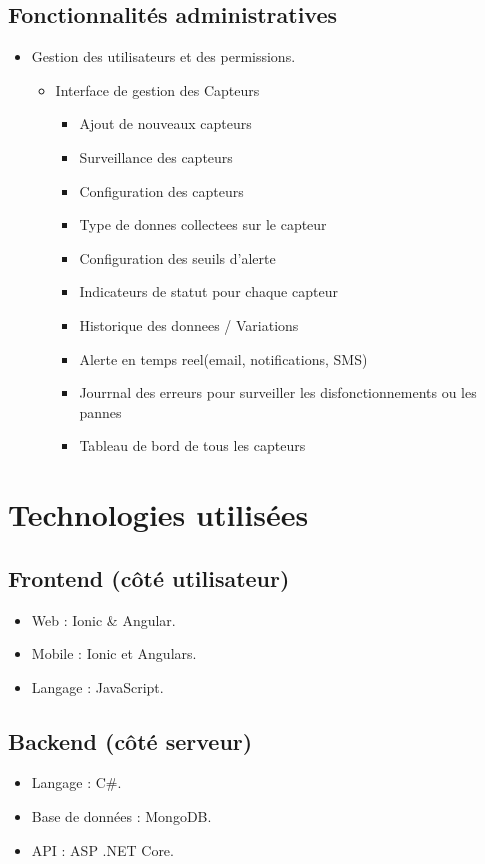 \documentclass[a4paper,12pt]{article}
\begin{document}
\subsection{Fonctionnalités administratives}
\begin{itemize}
    \item Gestion des utilisateurs et des permissions.
    \begin{itemize}
    \item Interface de gestion des Capteurs
    \begin{itemize}
        \item Ajout de nouveaux capteurs
        \item Surveillance des capteurs
        \item Configuration des capteurs
        \item Type de donnes collectees sur le capteur
	\item Configuration des seuils d'alerte
        \item Indicateurs de statut pour chaque capteur
     \item Historique des donnees / Variations
    \item Alerte en temps reel(email, notifications, SMS)
	\item Jourrnal des erreurs pour surveiller les disfonctionnements ou les pannes
\item Tableau de bord de tous les capteurs 
    \end{itemize}
\end{itemize}
\end{itemize}

\section{Technologies utilisées}
\subsection{Frontend (côté utilisateur)}
\begin{itemize}
    \item Web : Ionic \&  Angular.
    \item Mobile : Ionic et Angulars.
  \item Langage : JavaScript.

\end{itemize}

\subsection{Backend (côté serveur)}
\begin{itemize}
    \item Langage : C\#.
    \item Base de données : MongoDB.
    \item API : ASP .NET Core.
\end{itemize}
\end{document}
